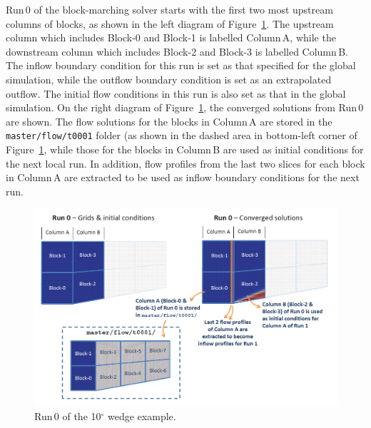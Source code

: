\documentclass[12pt,a4paper,twoside]{article}
\begin{document}
\medskip
Run\,0 of the block-marching solver starts with the first two most upstream columns of 
blocks, as shown in the left diagram of Figure~\ref{f:wedge10-run-0}. The upstream column 
which includes Block-0 and Block-1 is labelled Column\,A, while the downstream column 
which includes Block-2 and Block-3 is labelled Column\,B. The inflow boundary condition 
for this run is set as that specified for the global simulation, while the outflow 
boundary condition is set as an extrapolated outflow. The initial flow conditions in 
this run is also set as that in the global simulation. On the right diagram of 
Figure~\ref{f:wedge10-run-0}, the converged solutions from Run\,0 are shown. The flow
solutions for the blocks in Column\,A are stored in the \texttt{master/flow/t0001} 
folder (as shown in the dashed area in bottom-left corner of Figure~\ref{f:wedge10-run-0}, 
while those for the blocks in Column\,B are used as initial conditions for the next 
local run. In addition, flow profiles from the last two slices for each block in 
Column\,A are extracted to be used as inflow boundary conditions for the next run.
%
\begin{figure}[htbp]
   \centerline{ \includegraphics[width=15cm]{figs/e3march-run-0.png} }
   \caption{Run\,0 of the 10$^\circ$ wedge example.}
   \label{f:wedge10-run-0}
\end{figure}
\end{document}
